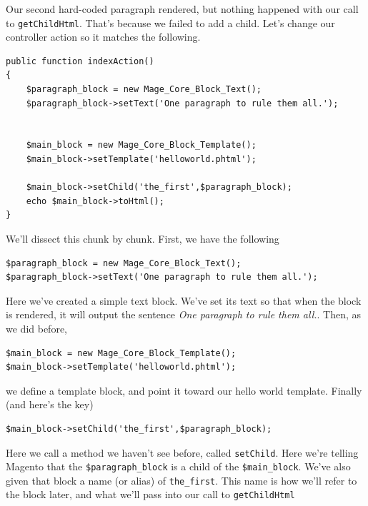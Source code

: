 \documentclass[oneside]{book}
\begin{document}
Our second hard-coded paragraph rendered, but nothing happened with our call to \footnotesize\texttt{getChildHtml}\normalsize.  That's because we failed to add a child.  Let's change our controller action so it matches the following.

\begin{lstlisting}
public function indexAction()
{       
    $paragraph_block = new Mage_Core_Block_Text();
    $paragraph_block->setText('One paragraph to rule them all.');


    $main_block = new Mage_Core_Block_Template();
    $main_block->setTemplate('helloworld.phtml');

    $main_block->setChild('the_first',$paragraph_block);
    echo $main_block->toHtml(); 
}

\end{lstlisting}


We'll dissect this chunk by chunk.  First, we have the following

\begin{lstlisting}
$paragraph_block = new Mage_Core_Block_Text();
$paragraph_block->setText('One paragraph to rule them all.');

\end{lstlisting}


Here we've created a simple text block.  We've set its text so that when the block is rendered, it will output the sentence \emph{One paragraph to rule them all.}.  Then, as we did before, 

\begin{lstlisting}
$main_block = new Mage_Core_Block_Template();
$main_block->setTemplate('helloworld.phtml');

\end{lstlisting}


we define a template block, and point it toward our hello world template.  Finally (and here's the key)     

\begin{lstlisting}
$main_block->setChild('the_first',$paragraph_block);

\end{lstlisting}


Here we call a method we haven't see before, called \footnotesize\texttt{setChild}\normalsize.  Here we're telling Magento that the \footnotesize\texttt{\$paragraph\_block} \normalsize  is a child of the \footnotesize\texttt{\$main\_block}\normalsize.  We've also given that block a name (or alias) of \footnotesize\texttt{the\_first}\normalsize.  This name is how we'll refer to the block later, and what we'll pass into our call to \footnotesize\texttt{getChildHtml} \normalsize 
\end{document}
